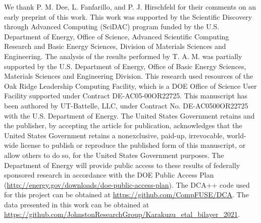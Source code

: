 \documentclass[prb,twocolumn,amsmath,amssymb,superscriptaddress,floatfix,nofootinbib]{revtex4-2}
\begin{document}
\begin{acknowledgments}
We thank P. M. Dee, L. Fanfarillo, and P. J. Hirschfeld for their comments on an early preprint of this work. This work was supported by the Scientific Discovery through Advanced Computing (SciDAC) program funded by the U.S. Department of Energy, Office of Science, Advanced Scientific Computing Research and Basic Energy Sciences, Division of Materials Sciences and Engineering. The analysis of the results performed by T. A. M. was partially supported by the U.S. Department of Energy, Office of Basic Energy Sciences, Materials Sciences and Engineering Division. This research used resources of the Oak Ridge Leadership Computing Facility, which is a DOE Office of Science User Facility supported under Contract DE-AC05-00OR22725. This manuscript has been authored by UT-Battelle, LLC, under Contract No. DE-AC0500OR22725 with the U.S. Department of Energy. The United States Government retains and the publisher, by accepting the article for publication, acknowledges that the United States Government retains a nonexclusive, paid-up, irrevocable, world-wide license to publish or reproduce the published form of this manuscript, or allow others to do so, for the United States Government purposes. The Department of Energy will provide public access to these results of federally sponsored research in accordance with the DOE Public Access Plan (\url{http://energy.gov/downloads/doe-public-access-plan}). The DCA++ code used for this project can be obtained at \url{https://github.com/CompFUSE/DCA}. The data presented in this work can be obtained at \url{https://github.com/JohnstonResearchGroup/Karakuzu_etal_bilayer_2021}. 
\end{acknowledgments}

\appendix
\end{document}
